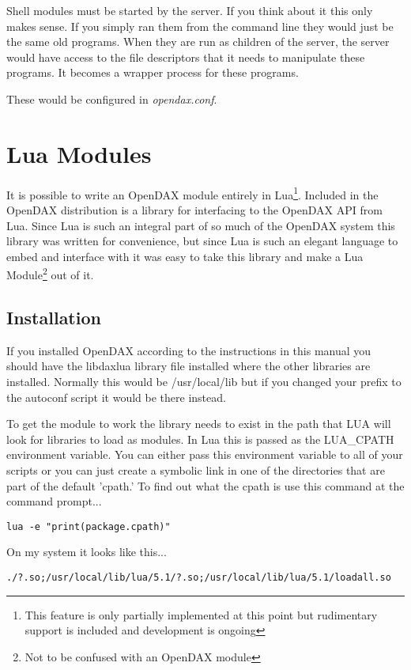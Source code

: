 Shell modules must be started by the \opendax server.  If you think about it this only makes sense.  If you simply ran them from the command line they would just be the same old programs.  When they are run as children of the \opendax server, the server would have access to the file descriptors that it needs to manipulate these programs.  It becomes a wrapper process for these programs.

These would be configured in \textit{opendax.conf}.

\chapter{Lua Modules}

It is possible to write an OpenDAX module entirely in Lua\footnote{This feature is only partially implemented at this point but rudimentary support is included and development is ongoing}.  Included in the OpenDAX distribution is a library for interfacing to the OpenDAX API from Lua.  Since Lua is such an integral part of so much of the OpenDAX system this library was written for convenience, but since Lua is such an elegant language to embed and interface with it was easy to take this library and make a Lua Module\footnote{Not to be confused with an OpenDAX module} out of it. 

\section{Installation}

If you installed OpenDAX according to the instructions in this manual you should have the libdaxlua library file installed where the other libraries are installed.  Normally this would be /usr/local/lib but if you changed your prefix to the autoconf script it would be there instead.

To get the module to work the library needs to exist in the path that LUA will look for libraries to load as modules.  In Lua this is passed as the LUA\_CPATH environment variable.  You can either pass this environment variable to all of your scripts or you can just create a symbolic link in one of the directories that are part of the default 'cpath.'  To find out what the cpath is use this command at the command prompt...

\verb|lua -e "print(package.cpath)"|

On my system it looks like this...

\verb|./?.so;/usr/local/lib/lua/5.1/?.so;/usr/local/lib/lua/5.1/loadall.so|

